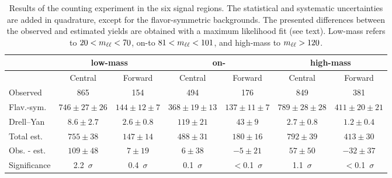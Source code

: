 
\begin{table}[hbtp]
 \renewcommand{\arraystretch}{1.3}
 \setlength{\belowcaptionskip}{6pt}
 \scriptsize
 \centering
 \caption{Results of the counting experiment in the six signal regions.
     The statistical and systematic uncertainties are added in quadrature, except for the flavor-symmetric backgrounds. The presented differences between the observed and estimated yields are obtained with a maximum likelihood fit (see text).    Low-mass refers to $20 < m_{\ell\ell} < 70$\GeV, on-\Z to  $81 < m_{\ell\ell} < 101$\GeV, and high-mass to $m_{\ell\ell} > 120$\GeV.
     }
  \label{tab:METresults2012}
  \begin{tabular}{l| cc | cc | cc}

    							& \multicolumn{2}{c}{low-mass} & \multicolumn{2}{c}{on-\Z} & \multicolumn{2}{c}{high-mass} \\ 

    \hline
                                &  Central        & Forward  &  Central  & Forward   &  Central        & Forward \\ 

    \hline
        Observed       &  865                   & 154              &  494            &  176       &   849           &   381    \\

    \hline
        Flav.-sym.    & $746\pm27\pm26$        & $144\pm12\pm7$  &  $368\pm19\pm13$ & $137\pm11\pm7$ & $789\pm28\pm28$ & $411\pm20\pm21$ \\

            Drell--Yan          & $8.6\pm2.7$            & $2.6\pm0.8$      & $119\pm21$ & $43\pm9$ & $2.7\pm0.8$ & $1.2\pm0.4$ \\

    \hline
            Total est.          & $755\pm38$            & $147\pm14$      & $488\pm31$ & $180\pm16$ & $792\pm39$ & $413\pm30$ \\

    \hline
         Obs. - est.  & $109\pm48$      & $7\pm19$ & $6\pm38 $ & $-5\pm21$ & $57\pm50$ & $-32\pm37 $ \\ 

    \hline
   Significance      & 2.2~$\sigma$    &  0.4~$\sigma$  & 0.1~$\sigma$ & $<$0.1~$\sigma$ & 1.1~$\sigma$ & $<$0.1~$\sigma$ \\ 


  \end{tabular}
\end{table}


